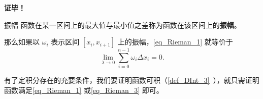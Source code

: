 \textbf{证毕！}

\begin{definition}{振幅}\label{def_Rieman_1}
函数在某一区间上的最大值与最小值之差称为函数在该区间上的\textbf{振幅}。
\end{definition}
那么如果以 $\omega_i$ 表示区间 $[x_i,x_{i+1}]$ 上的振幅，\autoref{eq_Rieman_1} 就等价于
\begin{equation}\label{eq_Rieman_3}
\lim_{\lambda\rightarrow0}\sum_{i=0}^{n-1}\omega_i\Delta x_i=0.
\end{equation}

有了定积分存在的充要条件，我们要证明函数可积（\autoref{def_DInt_3}~），就只需证明函数满足\autoref{eq_Rieman_1} 或\autoref{eq_Rieman_3} 即可。





